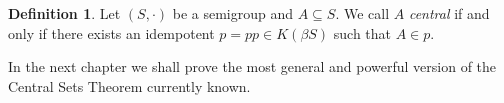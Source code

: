 \documentclass[12pt,showtrims]{memoir}
\theoremstyle{plain}
\theoremstyle{definition}
\newtheorem{defn}[thm]{Definition}
\begin{document}
\begin{defn}
  Let $(S, \cdot)$ be a semigroup and $A \subseteq S$.
  We call $A$ \emph{central} if and only if there exists an idempotent $p = pp \in K(\beta S)$ such that $A \in p$.
\end{defn}

In the next chapter we shall prove the most general and powerful version of the Central Sets Theorem currently known.

\theendnotes



\end{document}
